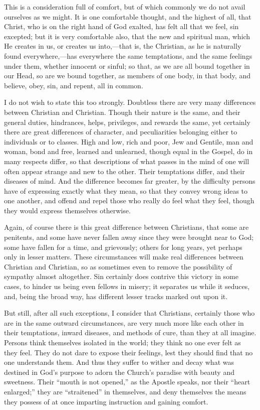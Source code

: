 This is a consideration full of comfort, but of which commonly we
do not avail ourselves as we might. It is one comfortable thought, and
the highest of all, that Christ, who is on the right hand of God
exalted, has felt all that we feel, sin excepted; but it is very
comfortable also, that the new and spiritual man, which He creates in
us, or creates us into,—that is, the Christian, as he is naturally
found everywhere,—has everywhere the same temptations, and the same
feelings under them, whether innocent or sinful; so that, as we are
all bound together in our Head, so are we bound together, as members
of one body, in that body, and believe, obey, sin, and repent, all in
common.

I do not wish to state this too strongly. Doubtless there are very
many differences between Christian and Christian. Though their nature
is the same, and their general duties, hindrances, helps, privileges,
and rewards the same, yet certainly there are great differences of
character, and peculiarities belonging either to individuals or to
classes. High and low, rich and poor, Jew and Gentile, man and woman,
bond and free, learned and unlearned, though equal in the Gospel, do
in many respects differ, so that descriptions of what passes in the
mind of one will often appear strange and new to the other. Their
temptations differ, and their diseases of mind. And the difference
becomes far greater, by the difficulty persons have of expressing
exactly what they mean, so that they convey wrong ideas to one
another, and offend and repel those who really do feel what they feel,
though they would express themselves otherwise.

Again, of course there is this great difference between Christians,
that some are penitents, and some have never fallen away since they
were brought near to God; some have fallen for a time, and grievously;
others for long years, yet perhaps only in lesser matters. These
circumstances will make real differences between Christian and
Christian, so as sometimes even to remove the possibility of sympathy
almost altogether. Sin certainly does contrive this victory in some
cases, to hinder us being even fellows in misery; it separates us
while it seduces, and, being the broad way, has different lesser
tracks marked out upon it.

But still, after all such exceptions, I consider that Christians,
certainly those who are in the same outward circumstances, are very
much more like each other in their temptations, inward diseases, and
methods of cure, than they at all imagine. Persons think themselves
isolated in the world; they think no one ever felt as they feel. They
do not dare to expose their feelings, lest they should find that no
one understands them. And thus they suffer to wither and decay what
was destined in God's purpose to adorn the Church's paradise with
beauty and sweetness. Their ``mouth is not opened,'' as the
Apostle speaks, nor their ``heart enlarged;'' they are
``straitened'' in themselves, and deny themselves the means
they possess of at once imparting instruction and gaining comfort.

